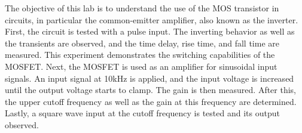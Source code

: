 The objective of this lab is to understand the use of the MOS transistor in circuits, in particular the common-emitter ampliﬁer, also known as the inverter. First, the circuit is tested with a pulse input. The inverting behavior as well as the transients are observed, and the time delay, rise time, and fall time are measured. This experiment demonstrates the switching capabilities of the MOSFET. Next, the MOSFET is used as an ampliﬁer for sinusoidal input signals. An input signal at 10kHz is applied, and the input voltage is increased until the output voltage starts to clamp. The gain is then measured. After this, the upper cutoﬀ frequency as well as the gain at this frequency are determined. Lastly, a square wave input at the cutoﬀ frequency is tested and its output observed. \\

